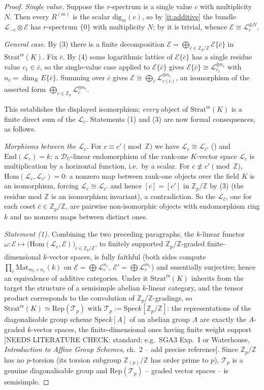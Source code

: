 \documentclass[11pt,reqno]{amsart}
\newcommand{\NEEDSLITERATURECHECK}[1]{{\color{green!40!black}\textsf{[NEEDS
LITERATURE CHECK: #1]}}}
\newcommand{\Zp}{\mathbb{Z}_p}
\newcommand{\ZZ}{\mathbb{Z}}
\newcommand{\cD}{\mathcal{D}}
\newcommand{\cE}{\mathcal{E}}
\newcommand{\cL}{\mathcal{L}}
\newcommand{\cT}{\mathcal{T}}
\newcommand{\Strat}{\mathrm{Strat}}
\newcommand{\rs}{\mathrm{rs}}
\newcommand{\Rep}{\mathrm{Rep}}
\newcommand{\Hom}{\mathrm{Hom}}
\newcommand{\End}{\mathrm{End}}
\newcommand{\Spec}{\mathrm{Spec}}
\newcommand{\dig}{\mathrm{dig}}
\theoremstyle{plain}
\theoremstyle{definition}
\theoremstyle{remark}
\numberwithin{equation}{section}
\begin{document}
\begin{proof}
\emph{Single value.}  Suppose the $r$-spectrum is a single value $c$ with
multiplicity $N$.  Then every $R^{(m)}$ is the scalar $\dig_m(c)$, so by
\eqref{it:additive} the bundle
$\cL_{-c}\otimes\cE$ has $r$-spectrum $\{0\}$ with multiplicity $N$; by
 it is trivial, whence $\cE\cong\cL_c^{\oplus N}$.

\emph{General case.}  By (3) there is a finite
decomposition $\cE=\bigoplus_{\bar c\in\Zp/\ZZ}\cE\{\bar c\}$ in
$\Strat^{\rs}(K)$.  Fix $\bar c$.  By (4) some
logarithmic lattice of $\cE\{\bar c\}$ has a single residue value
$c_1\in\bar c$, so the single-value case applied to $\cE\{\bar c\}$ gives
$\cE\{\bar c\}\cong\cL_{c_1}^{\oplus n_{\bar c}}$ with
$n_{\bar c}=\dim_KE\{\bar c\}$.  Summing over $\bar c$ gives
$\cE\cong\bigoplus_{\bar c}\cL_{c(\bar c)}^{\oplus n_{\bar c}}$, an
isomorphism of the asserted form $\bigoplus_{c\in\Zp}\cL_c^{\oplus n_c}$.

This establishes the displayed isomorphism; \emph{every} object of
$\Strat^{\rs}(K)$ is a finite direct sum of the $\cL_c$.  Statements (1)
and (3) are now formal consequences, as follows.

\emph{Morphisms between the $\cL_c$.}  For $c\equiv c'\pmod\ZZ$ we have
$\cL_c\cong\cL_{c'}$ () and
$\End(\cL_c)=k$: a $\cD_U$-linear endomorphism of the rank-one
$K$-vector space $\cL_c$ is multiplication by a horizontal function,
i.e.\ by a scalar.  For $c\not\equiv c'\pmod\ZZ$, $\Hom(\cL_c,\cL_{c'})=0$:
a nonzero map between rank-one objects over the field $K$ is an
isomorphism, forcing $\cL_c\cong\cL_{c'}$ and hence $[c]=[c']$ in
$\Zp/\ZZ$ by (3) (the residue mod $\ZZ$ is an
isomorphism invariant), a contradiction.  So the $\cL_{\bar c}$, one for each coset
$\bar c\in\Zp/\ZZ$, are pairwise non-isomorphic objects with
endomorphism ring $k$ and no nonzero maps between distinct ones.

\emph{Statement (1).}  Combining the two preceding paragraphs, the
$k$-linear functor
$\omega\colon\cE\mapsto\bigl(\Hom(\cL_c,\cE)\bigr)_{\bar c\in\Zp/\ZZ}$,
to finitely supported $\Zp/\ZZ$-graded finite-dimensional $k$-vector
spaces, is fully faithful (both sides compute
$\prod_{\bar c}\mathrm{Mat}_{m_{\bar c}\times n_{\bar c}}(k)$ on
$\cE=\bigoplus\cL_c^{n_c}$, $\cE'=\bigoplus\cL_c^{m_c}$) and essentially
surjective; hence an equivalence of additive categories.  Under it
$\Strat^{\rs}(K)$ inherits from the target the structure of a semisimple
abelian $k$-linear category, and the tensor product corresponds to the
convolution of $\Zp/\ZZ$-gradings, so
$\Strat^{\rs}(K)\simeq\Rep(\cT_p)$ with $\cT_p:=\Spec k[\Zp/\ZZ]$: the
representations of the diagonalisable group scheme $\Spec k[A]$ of an
abelian group $A$ are exactly the $A$-graded $k$-vector spaces, the
finite-dimensional ones having finite weight support
\NEEDSLITERATURECHECK{standard; e.g.\ SGA3 Exp.\ I or Waterhouse,
\emph{Introduction to Affine Group Schemes}, ch.\ 2 -- add precise
reference}.  Since $\Zp/\ZZ$ has no $p$-torsion (its torsion subgroup
$\ZZ_{(p)}/\ZZ$ has order prime to $p$), $\cT_p$ is a genuine
diagonalisable group and $\Rep(\cT_p)$ -- graded vector spaces -- is
semisimple.


\end{proof}
\end{document}
